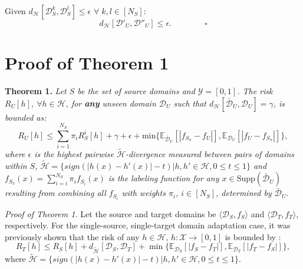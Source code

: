 \documentclass{article}
\begin{document}
Given $d_{\mathcal{H}}[\mathcal{D}^k_S, \mathcal{D}^l_S] \leq \epsilon$ $\forall \; k,l \in[N_S]$:
\begin{equation*}
d_{\mathcal{H}}[\mathcal{D}'_U, \mathcal{D}''_U] \leq \epsilon. \qquad \qquad \square   
\end{equation*}

\section{Proof of Theorem 1}
\textbf{Theorem 1.} \textit{Let $S$ be the set of source domains and  $\mathcal{Y} = [0, 1]$. The risk $R_U[h]$, $ \forall h \in \mathcal{H}$, for \textbf{any} unseen domain $\mathcal{D}_U$ such that $d_{\mathcal{H}}[\bar{\mathcal{D}}_U, \mathcal{D}_U] = \gamma$, is bounded as:}
\begin{equation}\label{eq:bound_1}
     R_U[h] \leq \sum_{i=1}^{N_S} \pi_{i} R^i_S[h] + \gamma+\epsilon +
     \text{min}\{\mathbb{E}_{\bar{\mathcal{D}}_U}[|f_{S_{\pi}} - f_U|], \mathbb{E}_{\mathcal{D}_U}[|f_U - f_{S_\pi}|]\},
\end{equation}
\textit{where $\epsilon$ is the highest pairwise $\mathcal{\tilde{H}}$-divergence measured between pairs of domains within $S$, $\mathcal{\tilde{H}} = \{sign(|h(x) - h'(x)| - t) | h, h' \in \mathcal{H},0\leq t\leq1\}$ and $f_{S_{\pi}}(x) = \sum_{i=i}^{N_S} \pi_i f_{S_i}(x)$ is the labeling function for any $x\in \text{Supp}(\bar{\mathcal{D}}_U)$ resulting from combining all $f_{S_i}$ with weights $\pi_i$, $i\in[N_S]$, determined by $\bar{\mathcal{D}}_U$}.

\textit{Proof of Theorem 1.} Let the source and target domains be $\langle \mathcal{D}_S, f_S \rangle$ and $\langle \mathcal{D}_T, f_T \rangle$, respectively. For the single-source, single-target domain adaptation case, it was previously shown that the risk of any $h \in \mathcal{H}$, $h: \mathcal{X} \rightarrow [0, 1]$ is bounded by \cite{zhao2019learning}:
\begin{equation}\label{eq:zhao_19}
    R_T[h] \leq R_S[h] + d_{\mathcal{\tilde{H}}}[\mathcal{D}_S, \mathcal{D}_T]
    + \min \{\mathbb{E}_{\mathcal{D}_S}[|f_S - f_T|],
    \mathbb{E}_{\mathcal{D}_T}[|f_T - f_S|]\},    
\end{equation}
where $\mathcal{\tilde{H}} = \{sign(|h(x) - h'(x)| - t) | h, h' \in \mathcal{H},0\leq t\leq1\}$.
\end{document}
